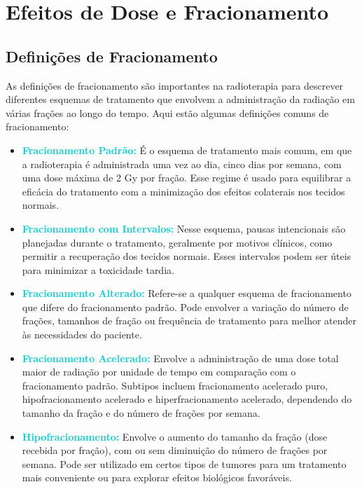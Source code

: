 \documentclass[11pt,a4paper]{article}
\begin{document}
\section{Efeitos de Dose e Fracionamento}

\subsection*{Definições de Fracionamento}

	As definições de fracionamento são importantes na radioterapia para descrever diferentes esquemas de tratamento que envolvem a administração da radiação em várias frações ao longo do tempo. Aqui estão algumas definições comuns de fracionamento:

	\begin{itemize}
		\item \textcolor{DarkTurquoise}{\textbf{Fracionamento Padrão:}} É o esquema de tratamento mais comum, em que a radioterapia é administrada uma vez ao dia, cinco dias por semana, com uma dose máxima de 2 Gy por fração. Esse regime é usado para equilibrar a eficácia do tratamento com a minimização dos efeitos colaterais nos tecidos normais.

		\item \textcolor{DarkTurquoise}{\textbf{Fracionamento com Intervalos:}} Nesse esquema, pausas intencionais são planejadas durante o tratamento, geralmente por motivos clínicos, como permitir a recuperação dos tecidos normais. Esses intervalos podem ser úteis para minimizar a toxicidade tardia.

		\item \textcolor{DarkTurquoise}{\textbf{Fracionamento Alterado:}} Refere-se a qualquer esquema de fracionamento que difere do fracionamento padrão. Pode envolver a variação do número de frações, tamanhos de fração ou frequência de tratamento para melhor atender às necessidades do paciente.

		\item \textcolor{DarkTurquoise}{\textbf{Fracionamento Acelerado:}} Envolve a administração de uma dose total maior de radiação por unidade de tempo em comparação com o fracionamento padrão. Subtipos incluem fracionamento acelerado puro, hipofracionamento acelerado e hiperfracionamento acelerado, dependendo do tamanho da fração e do número de frações por semana.

		\item \textcolor{DarkTurquoise}{\textbf{Hipofracionamento:}} Envolve o aumento do tamanho da fração (dose recebida por fração), com ou sem diminuição do número de frações por semana. Pode ser utilizado em certos tipos de tumores para um tratamento mais conveniente ou para explorar efeitos biológicos favoráveis.


\end{itemize}
\end{document}
